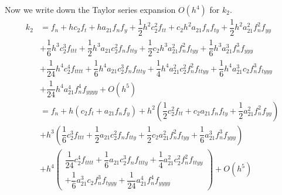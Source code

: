 \documentclass[a4paper,oneside]{book}
\numberwithin{equation}{chapter}
\begin{document}
Now we write down the Taylor series expansion $O\left(h^4\right)$ for $k_2$.
\begin{align}
{k_2} &= {f_n} + h{c_2}{f_t} + h{a_{21}}{f_n}{f_y} + \dfrac{1}{2}{h^2}c_2^2{f_{tt}} + {c_2}{h^2}{a_{21}}{f_n}{f_{ty}} + \dfrac{1}{2}{h^2}a_{21}^2f_n^2{f_{yy}}\\
& + \dfrac{1}{6}{h^3}c_2^3{f_{ttt}} + \dfrac{1}{2}{h^3}{a_{21}}c_2^2{f_n}{f_{tty}} + \dfrac{1}{2}{c_2}{h^3}a_{21}^2f_n^2{f_{tyy}} + \dfrac{1}{6}{h^3}a_{21}^3f_n^3{f_{yyy}}\\
& + \dfrac{1}{{24}}{h^4}c_2^4{f_{tttt}} + \dfrac{1}{6}{h^4}{a_{21}}c_2^3{f_n}{f_{ttty}} + \dfrac{1}{4}{h^4}a_{21}^2c_2^2f_n^2{f_{ttyy}} + \dfrac{1}{6}{h^4}a_{21}^3{c_2}f_n^3{f_{tyyy}}\\
& + \dfrac{1}{{24}}{h^4}a_{21}^4f_n^4{f_{yyyy}} + O\left( {{h^5}} \right)\\
& = {f_n} + h\left( {{c_2}{f_t} + {a_{21}}{f_n}{f_y}} \right) + {h^2}\left( {\dfrac{1}{2}c_2^2{f_{tt}} + {c_2}{a_{21}}{f_n}{f_{ty}} + \dfrac{1}{2}a_{21}^2f_n^2{f_{yy}}} \right)\\
& + {h^3}\left( {\dfrac{1}{6}c_2^3{f_{ttt}} + \dfrac{1}{2}{a_{21}}c_2^2{f_n}{f_{tty}} + \dfrac{1}{2}{c_2}a_{21}^2f_n^2{f_{tyy}} + \dfrac{1}{6}a_{21}^3f_n^3{f_{yyy}}} \right)\\
& + {h^4}\left( \begin{array}{l}
\dfrac{1}{{24}}c_2^4{f_{tttt}} + \dfrac{1}{6}{a_{21}}c_2^3{f_n}{f_{ttty}} + \dfrac{1}{4}a_{21}^2c_2^2f_n^2{f_{ttyy}}\\
 + \dfrac{1}{6}a_{21}^3{c_2}f_n^3{f_{tyyy}} + \dfrac{1}{{24}}a_{21}^4f_n^4{f_{yyyy}}
\end{array} \right) + O\left( {{h^5}} \right)
\end{align}
\end{document}
